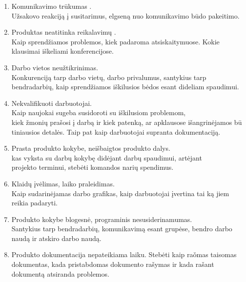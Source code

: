 \documentclass[a4paper,12pt]{article}
\begin{document}
\begin{enumerate}
	\item Komunikavimo tr\= ukumas . \\
 		U\v zsakovo reakcij\k a \k i susitarimus, elgsen\k a nuo komunikavimo b\= udo pakeitimo. 
  		
	\item Produktas neatitinka reikalavim\k u . \\
		Kaip sprend\v ziamos problemos, kiek padaroma atsiskaitymuose. Kokie klausimai i\v skeliami konferencijose.
		
	\item Darbo vietos neu\v ztikrinimas.\\
  		Konkurencij\k a tarp darbo viet\k u, darbo privalumus, santykius tarp bendradarbi\k u,
  		kaip sprend\v ziamos i\v skilusios b\. edos esant dideliam spaudimui.
  		
	\item Nekvalifikuoti darbuotojai. \\
  		Kaip naujokai sugeba susidoroti su i\v skilusiom problemom, \\ kiek \v zmoni\k u
  		pra\v sosi \k i darb\k a ir kiek patenk\k a, ar apklausose i\v sangrin\. ejamos
  		b\= u tiniausios detal\. es. Taip pat kaip  darbuotojai supranta dokumentacij\k a.

	\item Prasta produkto kokybe, nei\v sbaigtos produkto dalys.\\
		kas vyksta su darb\k u kokyb\k e did\. ejant darb\k u spaudimui, art\. ejant \\
		projekto terminui, steb\. eti komandos nari\k u spendimus.
  		
	\item Klaid\k u \k iv\. elimas, laiko praleidimas.\\
  		Kaip sudarin\. ejamas darbo grafikas, kaip darbuotojai \k ivertina tai k\k a jiem
  		reikia padaryti.
  		
	\item Produkto kokybe blogesn\. e,	programinis nesusiderinamumas. \\ 
  		Santykius tarp bendradarbi\k u, komunikavim\k a esant grup\. ese, bendro darbo 
  		naud\k a ir atskiro darbo naud\k a.
  		
	\item Produkto dokumentacija nepateikiama laiku.
  		Steb\. eti kaip ra\v omas taisomas dokumentas, kada pristabdomas dokumento ra\v symas
  		ir kada ra\v sant dokument\k a atsiranda problemos.

	
  		
\end{enumerate}
\end{document}
